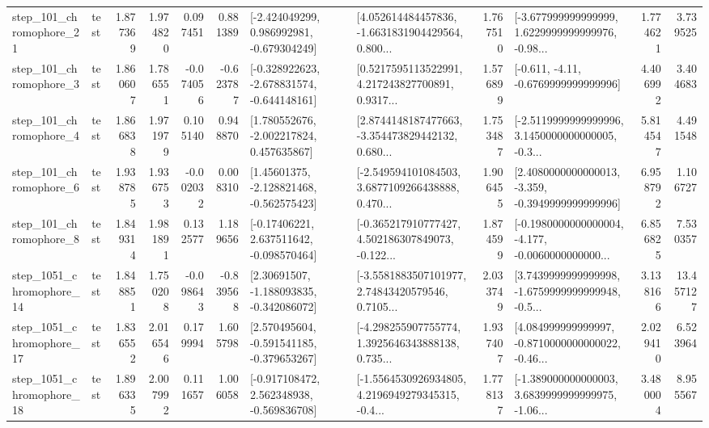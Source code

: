 \begin{tabular}{llrrrrllrlrr}
  step\_101\_chromophore\_21 &      test &      1.877369 &    1.974820 &      0.097451 &  0.881389 &   [-2.424049299, 0.986992981, -0.679304249] &  [4.052614484457836, -1.6631831904429564, 0.800... &       1.767510 &  [-3.677999999999999, 1.6229999999999976, -0.98... &            1.774621 &          3.739525 \\
   step\_101\_chromophore\_3 &      test &      1.860607 &    1.786551 &     -0.074056 & -0.623787 &  [-0.328922623, -2.678831574, -0.644148161] &  [0.5217595113522991, 4.217243827700891, 0.9317... &       1.576899 &               [-0.611, -4.11, -0.6769999999999996] &            4.406992 &          3.404683 \\
   step\_101\_chromophore\_4 &      test &      1.866838 &    1.971979 &      0.105140 &  0.948870 &    [1.780552676, -2.002217824, 0.457635867] &  [2.8744148187477663, -3.354473829442132, 0.680... &       1.753487 &  [-2.5119999999999996, 3.1450000000000005, -0.3... &            5.814547 &          4.491548 \\
   step\_101\_chromophore\_6 &      test &      1.938785 &    1.936753 &     -0.002032 &  0.008310 &    [1.45601375, -2.128821468, -0.562575423] &  [-2.549594101084503, 3.6877109266438888, 0.470... &       1.906455 &  [2.4080000000000013, -3.359, -0.3949999999999996] &            6.958792 &          1.106727 \\
   step\_101\_chromophore\_8 &      test &      1.849314 &    1.981891 &      0.132577 &  1.189656 &    [-0.17406221, 2.637511642, -0.098570464] &  [-0.365217910777427, 4.502186307849073, -0.122... &       1.874599 &  [-0.1980000000000004, -4.177, -0.0060000000000... &            6.856825 &          7.530357 \\
 step\_1051\_chromophore\_14 &      test &      1.848851 &    1.750208 &     -0.098643 & -0.839568 &    [2.30691507, -1.188093835, -0.342086072] &  [-3.5581883507101977, 2.74843420579546, 0.7105... &       2.033749 &  [3.7439999999999998, -1.6759999999999948, -0.5... &            3.138166 &         13.457127 \\
 step\_1051\_chromophore\_17 &      test &      1.836552 &    2.016546 &      0.179994 &  1.605798 &   [2.570495604, -0.591541185, -0.379653267] &  [-4.298255907755774, 1.3925646343888138, 0.735... &       1.937407 &  [4.084999999999997, -0.8710000000000022, -0.46... &            2.029410 &          6.523964 \\
 step\_1051\_chromophore\_18 &      test &      1.896335 &    2.007992 &      0.111657 &  1.006058 &   [-0.917108472, 2.562348938, -0.569836708] &  [-1.5564530926934805, 4.2196949279345315, -0.4... &       1.778137 &  [-1.389000000000003, 3.6839999999999975, -1.06... &            3.480004 &          8.955567 \\

\end{tabular}
